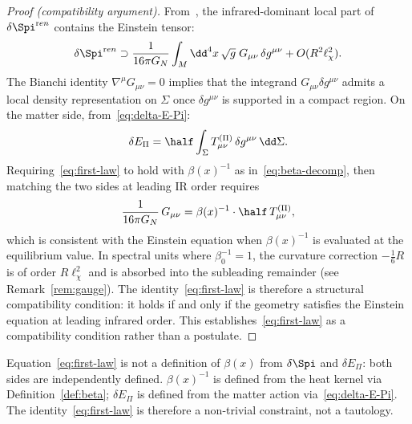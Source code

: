     \begin{proof}[Proof (compatibility argument)]
        From~\cite{Gravity20}, the infrared-dominant local part of $\delta\Spi^{\mathrm ren}$
        contains the Einstein tensor:
        \begin{equation}
          \delta\Spi^{\mathrm ren}
          \supset
          \frac{1}{16\pi G_N}
          \int_M \dd^4x\,\sqrt{g}\;G_{\mu\nu}\,\delta g^{\mu\nu}
          + O(R^2\ell_\chi^2).
          \label{eq:deltaS-EH}
        \end{equation}
        The Bianchi identity $\nabla^\mu G_{\mu\nu} = 0$ implies that the integrand
        $G_{\mu\nu}\delta g^{\mu\nu}$ admits a local density representation on $\Sigma$
        once $\delta g^{\mu\nu}$ is supported in a compact region.
        On the matter side, from~\eqref{eq:delta-E-Pi}:
        \begin{equation}
          \delta E_\Pi
          = \half\int_\Sigma T^{(\Pi)}_{\mu\nu}\,\delta g^{\mu\nu}\,\dd\Sigma.
          \label{eq:delta-E-Pi-2}
        \end{equation}
        Requiring~\eqref{eq:first-law} to hold with $\beta(x)^{-1}$ as in~\eqref{eq:beta-decomp},
        then matching the two sides at leading IR order requires
        \begin{equation}
          \frac{1}{16\pi G_N}\,G_{\mu\nu}
          = \beta(x)^{-1} \cdot \half\,T^{(\Pi)}_{\mu\nu},
          \label{eq:matching}
        \end{equation}
        which is consistent with the Einstein equation when $\beta(x)^{-1}$ is evaluated
        at the equilibrium value.
        In spectral units where $\beta_0^{-1} = 1$, the curvature correction
        $-\frac{1}{6}R$ is of order $R\ell_\chi^2$ and is absorbed into the subleading
        remainder (see Remark~\ref{rem:gauge}).
        The identity~\eqref{eq:first-law} is therefore a structural compatibility condition:
        it holds if and only if the geometry satisfies the Einstein equation at leading
        infrared order.
        This establishes~\eqref{eq:first-law} as a compatibility condition rather than
        a postulate.
    \end{proof}

    \begin{remark}
      \label{rem:identity-nature}
      Equation~\eqref{eq:first-law} is not a definition of $\beta(x)$ from $\delta\Spi$
      and $\delta E_\Pi$: both sides are independently defined.
      $\beta(x)^{-1}$ is defined from the heat kernel via Definition~\ref{def:beta};
      $\delta E_\Pi$ is defined from the matter action via~\eqref{eq:delta-E-Pi}.
      The identity~\eqref{eq:first-law} is therefore a non-trivial constraint, not a
      tautology.
    \end{remark}
